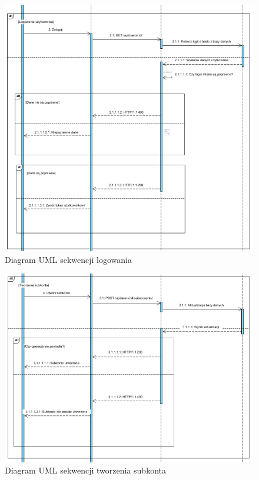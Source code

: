 \documentclass{article}
\begin{document}
	\begin{figure}[H]
		\hspace*{-2.5cm}
		\includegraphics[scale=0.9]{assets/sq2.png}
		\caption[]{Diagram UML sekwencji logowania}
		\label{fig:umllog}
	\end{figure}
	\begin{figure}[h]
		\vspace{-3.5cm}
		\hspace*{-2.5cm}
		\includegraphics[scale=0.9]{assets/sq3.png}
		\caption[]{Diagram UML sekwencji tworzenia subkonta}
		\label{fig:umlsub}
	\end{figure}
\end{document}
